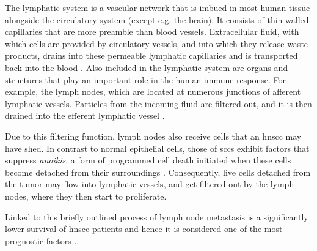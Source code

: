 \documentclass[\relativeRoot/main.tex]{subfiles}
\begin{document}
The lymphatic system is a vascular network that is imbued in most human tissue alongside the circulatory system (except e.g. the brain). It consists of thin-walled capillaries that are more preamble than blood vessels. Extracellular fluid, with which cells are provided by circulatory vessels, and into which they release waste products, drains into these permeable lymphatic capillaries and is transported back into the blood \cite{wissmann_pathways_2006,oliver_rediscovery_2002}. Also included in the lymphatic system are organs and structures that play an important role in the human immune response. For example, the lymph nodes, which are located at numerous junctions of afferent lymphatic vessels. Particles from the incoming fluid are filtered out, and it is then drained into the efferent lymphatic vessel \cite{willard-mack_normal_2006}.

Due to this filtering function, lymph nodes also receive cells that an \gls{hnscc} may have shed. In contrast to normal epithelial cells, those of \glspl{scc} exhibit factors that suppress \emph{anoikis}, a form of programmed cell death initiated when these cells become detached from their surroundings \cite{peltanova_effect_2019}. Consequently, live cells detached from the tumor may flow into lymphatic vessels, and get filtered out by the lymph nodes, where they then start to proliferate.

Linked to this briefly outlined process of lymph node metastasis is a significantly lower survival of \gls{hnscc} patients and hence it is considered one of the most prognostic factors \cite{jones_level_1994,lim_distributions_2006,takes_staging_2004}.
\end{document}
